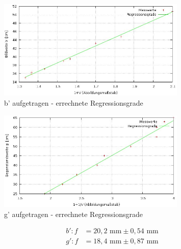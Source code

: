 \begin{figure}[H]
\includegraphics[width=0.8\textwidth]{pics/abbe1.jpg}
\caption{b' aufgetragen - errechnete Regressionsgrade}
\end{figure}

\begin{figure}[H]
\includegraphics[width=0.8\textwidth]{pics/abbe2.jpg}
\caption{g' aufgetragen - errechnete Regressionsgrade}
\end{figure}


\begin{align*}
b': f&=20,2 \text{ mm}         \pm 0,54 \text{ mm}\\
g': f&=18,4 \text{ mm}          \pm 0,87 \text{ mm}
\end{align*}


